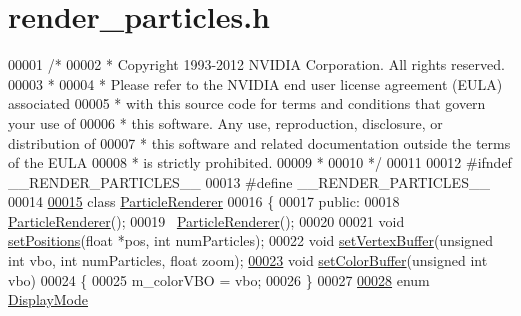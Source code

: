 \hypertarget{render__particles_8h_source}{\section{render\-\_\-particles.\-h}
}

\begin{DoxyCode}
00001 \textcolor{comment}{/*}
00002 \textcolor{comment}{ * Copyright 1993-2012 NVIDIA Corporation.  All rights reserved.}
00003 \textcolor{comment}{ *}
00004 \textcolor{comment}{ * Please refer to the NVIDIA end user license agreement (EULA) associated}
00005 \textcolor{comment}{ * with this source code for terms and conditions that govern your use of}
00006 \textcolor{comment}{ * this software. Any use, reproduction, disclosure, or distribution of}
00007 \textcolor{comment}{ * this software and related documentation outside the terms of the EULA}
00008 \textcolor{comment}{ * is strictly prohibited.}
00009 \textcolor{comment}{ *}
00010 \textcolor{comment}{ */}
00011 
00012 \textcolor{preprocessor}{#}\textcolor{preprocessor}{ifndef} \textcolor{preprocessor}{\_\_RENDER\_PARTICLES\_\_}
00013 \textcolor{preprocessor}{#}\textcolor{preprocessor}{define} \textcolor{preprocessor}{\_\_RENDER\_PARTICLES\_\_}
00014 
\hypertarget{render__particles_8h_source_l00015}{}\hyperlink{class_particle_renderer}{00015} \textcolor{keyword}{class} \hyperlink{class_particle_renderer}{ParticleRenderer}
00016 \{
00017     \textcolor{keyword}{public}:
00018         \hyperlink{class_particle_renderer_a1718484686c2e6db488cc88c433d03cc}{ParticleRenderer}();
00019         ~\hyperlink{class_particle_renderer_a281be31ad850fead012460fb6675db98}{ParticleRenderer}();
00020 
00021         \textcolor{keywordtype}{void} \hyperlink{class_particle_renderer_adb3204e8af23a65b05b1aca7f43f0430}{setPositions}(\textcolor{keywordtype}{float} *pos, \textcolor{keywordtype}{int} numParticles);
00022         \textcolor{keywordtype}{void} \hyperlink{class_particle_renderer_a396f73f6c16f24f34368557bfd5557e6}{setVertexBuffer}(\textcolor{keywordtype}{unsigned} \textcolor{keywordtype}{int} vbo, \textcolor{keywordtype}{int} numParticles, \textcolor{keywordtype}{float} zoom);
\hypertarget{render__particles_8h_source_l00023}{}\hyperlink{class_particle_renderer_af16e23ebcee20753d86d24e4e5e32c7c}{00023}         \textcolor{keywordtype}{void} \hyperlink{class_particle_renderer_af16e23ebcee20753d86d24e4e5e32c7c}{setColorBuffer}(\textcolor{keywordtype}{unsigned} \textcolor{keywordtype}{int} vbo)
00024         \{
00025             m\_colorVBO = vbo;
00026         \}
00027 
\hypertarget{render__particles_8h_source_l00028}{}\hyperlink{class_particle_renderer_a7b691afffd1abe415cb0ce17fd26f3d5}{00028}         \textcolor{keyword}{enum} \hyperlink{class_particle_renderer_a7b691afffd1abe415cb0ce17fd26f3d5}{DisplayMode}

\end{DoxyCode}
